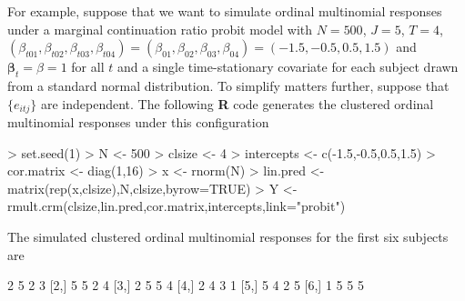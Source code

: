 \documentclass{article}
\begin{document}
\indent For example, suppose that we want to simulate ordinal multinomial responses under a marginal continuation ratio probit model with $N=500$, $J=5$, $T=4$, $(\beta_{t01},\beta_{t02},\beta_{t03},\beta_{t04})=(\beta_{01},\beta_{02},\beta_{03},\beta_{04})=(-1.5,-0.5,0.5,1.5)$ and $\boldsymbol \beta_t=\beta=1$ for all $t$ and a single time-stationary covariate for each subject drawn from a standard normal distribution. To simplify matters further, suppose that $\{e_{itj}\}$ are independent. The following \textbf{R} code generates the clustered ordinal multinomial responses under this configuration
\begin{Schunk}
\begin{Sinput}
> set.seed(1)
> N <- 500
> clsize <- 4
> intercepts <- c(-1.5,-0.5,0.5,1.5)
> cor.matrix <- diag(1,16)
> x <- rnorm(N)
> lin.pred <- matrix(rep(x,clsize),N,clsize,byrow=TRUE)
> Y <- rmult.crm(clsize,lin.pred,cor.matrix,intercepts,link="probit")
\end{Sinput}
\end{Schunk}
The simulated clustered ordinal multinomial responses for the first six subjects are 
\begin{Schunk}
\begin{Soutput}
     [,1] [,2] [,3] [,4]
[1,]    2    5    2    3
[2,]    5    5    2    4
[3,]    2    5    5    4
[4,]    2    4    3    1
[5,]    5    4    2    5
[6,]    1    5    5    5
\end{Soutput}
\end{Schunk}
\end{document}

